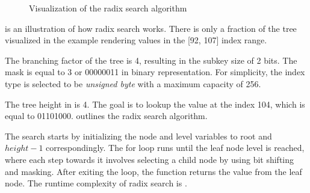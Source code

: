\begin{figure}[!ht]

    \caption{Visualization of the radix search algorithm}
    \label{fig:rb-tree-example-1}
\end{figure}

 is an illustration of how radix search works. There is only a fraction of the tree visualized in the example rendering values in the [92, 107] index range.

The branching factor of the tree is 4, resulting in the subkey size of 2 bits. The mask is equal to 3 or 00000011 in binary representation. For simplicity, the index type is selected to be \emph{unsigned byte} with a maximum capacity of 256.

The tree height in  is 4. The goal is to lookup the value at the index 104, which is equal to 01101000.  outlines the radix search algorithm.

The search starts by initializing the node and level variables to root and $height - 1$ correspondingly. The for loop runs until the leaf node level is reached, where each step towards it involves selecting a child node by using bit shifting and masking. After exiting the loop, the function returns the value from the leaf node. The runtime complexity of radix search is .

